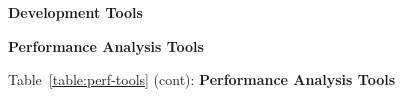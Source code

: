 \renewcommand{\firstColWidth}{5.6cm}
\renewcommand{\secondColWidth}{1.5cm}

\begin{table}[h!]
\caption{\bf Development Tools} \vspace*{\captionSpace{}} \label{table:dev-tools}

\vspace*{\tabSpaceBot{}}
\end{table}


\renewcommand{\firstColWidth}{4.5cm}
\renewcommand{\secondColWidth}{1.7cm}

\begin{table}[h!]
\caption{\bf Performance Analysis Tools} \vspace*{\captionSpace{}} \label{table:perf-tools}

\vspace*{\tabSpaceBot{}}
\end{table}

\begin{table}[h!]
\caption*{Table~\ref{table:perf-tools} (cont): {\bf Performance Analysis Tools} \vspace*{\captionSpace{}} }

\vspace*{\tabSpaceBot{}}
\end{table}

